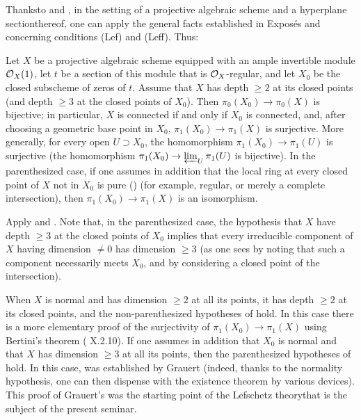 Thanks\pageoriginale to  and , in the setting of a projective algebraic scheme and a \og hyperplane section\fg thereof, one can apply the general facts established in Expos\'es  and  concerning conditions (Lef) and (Leff). Thus:

\begin{corollaire} \label{XII.3.5} Let $X$ be a projective algebraic scheme equipped with an ample invertible module $\mathcal O_X(1)$, let $t$ be a section of this module that is $\mathcal O_X$-regular, and let $X_0$ be the closed subscheme of zeros of $t$. Assume that $X$ has depth $\geq 2$ at its closed points (\resp and depth $\geq 3$ at the closed points of $X_0$). Then $\pi_0(X_0)\to \pi_0(X)$ is bijective; in particular, $X$ is connected if and only if $X_0$ is connected, and, after choosing a geometric base point in $X_0$, $\pi_1(X_0)\to \pi_1(X)$ is surjective. More generally, for every open $U\supset X_0$, the homomorphism $\pi_1(X_0)\to \pi_1(U)$ is surjective (\resp the homomorphism $\pi_1(X_0)\to \varprojlim_U\pi_1(U)$ is bijective). In the parenthesized case, if one assumes in addition that the local ring at every closed point of $X$ not in $X_0$ is pure () (for example, regular, or merely a complete intersection), then $\pi_1(X_0)\to \pi_1(X)$ is an isomorphism.
\end{corollaire}

Apply  and . Note that, in the parenthesized case, the hypothesis that $X$ have depth $\geq 3$ at the closed points of $X_0$ implies that every irreducible component of $X$ having dimension $\neq 0$ has dimension $\geq 3$ (as one sees by noting that such a component necessarily meets $X_0$, and by considering a closed point of the intersection).

\begin{remarquestar}
When $X$ is normal and has dimension $\geq 2$ at all its points, it has depth $\geq 2$ at its closed points, and the non-parenthesized hypotheses of  hold. In this case there is a more elementary proof of the surjectivity of $\pi_1(X_0)\to \pi_1(X)$ using Bertini's theorem (\cf {} X.2.10). If one assumes in addition that $X_0$ is normal and that $X$ has dimension $\geq 3$ at all its points, then the parenthesized hypotheses of  hold. In this case,  was established by Grauert (indeed, thanks to the normality hypothesis, one can then dispense with the existence theorem  by various devices)\pageoriginale. This proof of Grauert's was the starting point of the \og Lefschetz theory\fg that is the subject of the present seminar.
\end{remarquestar}

